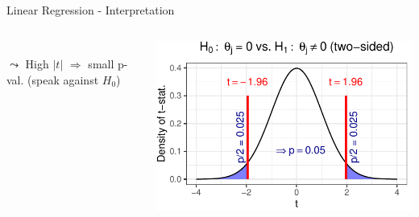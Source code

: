 \documentclass[11pt,compress,t,notes=noshow, aspectratio=169, xcolor=table]{beamer}
\begin{document}
\begin{frame}{Linear Regression - Interpretation}
{\begin{columns}[T, totalwidth=\textwidth]
\begin{column}{0.6\textwidth}
\begin{itemize}
        \\
        $\leadsto$ High $|t|$ $\Rightarrow$ small p-val. (speak against $H_0$)
    \end{itemize}
    \end{column}
    \begin{column}{0.4\textwidth}
        \includegraphics[width=\textwidth]{figure/p-value.pdf}
    \end{column}
    \end{columns}}
\end{frame}
\end{document}
